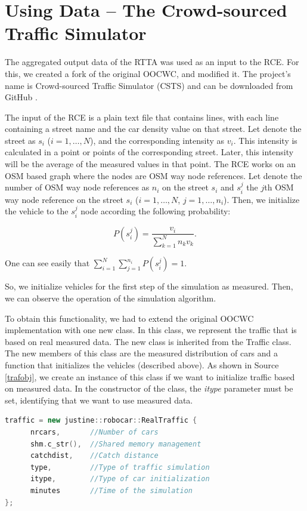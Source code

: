 \documentclass[b5paper,12pt]{report}
\theoremstyle{definition}
\begin{document}
\section{Using Data -- The Crowd-sourced Traffic Simulator}
\label{cstssect}

The aggregated output data of the RTTA was used as an input to the RCE. For this, we created a fork of the original OOCWC, and modified it. The project's name is Crowd-sourced Traffic Simulator (CSTS) and can be downloaded from GitHub \cite{csts-repo}.

The input of the RCE is a plain text file that contains lines, with each line containing a street name and the car density value on that street. Let denote the street as $s_i$ ($i=1, \dots, N$), and the corresponding intensity as $v_i$. This intensity is calculated in a point or points of the corresponding street. Later, this intensity will be the average of the measured values in that point. The RCE works on an OSM based graph where the nodes are OSM way node references. Let denote the number of OSM way node references as $n_i$ on the street $s_i$ and $s_i^j$ the $j$th OSM way node reference on the street $s_i$ ($i=1, \dots, N$, $j=1, \dots, n_i$). Then, we initialize the vehicle to the $s_i^j$ node according the following probability:

\[P(s_i^j)=\frac{v_i}{\sum_{k=1}^{N}{n_kv_k}}.\]

One can see easily that $\sum_{i=1}^{N}\sum_{j=1}^{n_i}P(s_i^j) = 1$.

So, we initialize vehicles for the first step of the simulation as measured. Then, we can observe the operation of the simulation algorithm.

To obtain this functionality, we had to extend the original OOCWC implementation with one new class. In this class, we represent the traffic that is based on real measured data. The new class is inherited from the Traffic class. The new members of this class are the measured distribution of cars and a function that initializes the vehicles (described above). As shown in Source \ref{trafobj}, we create an instance of this class if we want to initialize traffic based on measured data. In the constructor of the class, the \emph{itype} parameter must be set, identifying that we want to use measured data.

\begin{lstlisting}[language=C++,caption=Creating a RealTraffic object., label=trafobj]
traffic = new justine::robocar::RealTraffic {
      nrcars,       //Number of cars 
      shm.c_str(),  //Shared memory management
      catchdist,    //Catch distance 
      type,         //Type of traffic simulation
      itype,        //Type of car initialization  
      minutes       //Time of the simulation 
};
\end{lstlisting}
\end{document}
